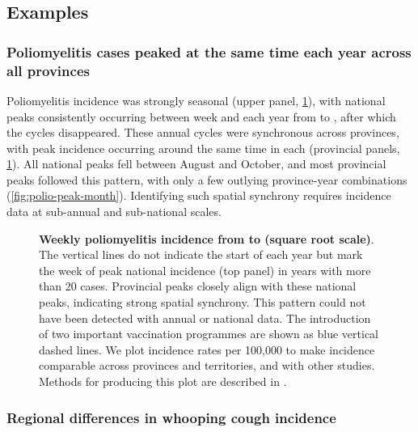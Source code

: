 \documentclass[12pt]{article}
\begin{document}
\subsection{Examples}\label{sec:illustrative-results}

\subsubsection{Poliomyelitis cases peaked at the same time each year across all provinces}\label{sec:polio-results}

Poliomyelitis incidence was strongly seasonal (upper panel, \cref{fig:polio-plot}), with national peaks consistently occurring between week  and  each year from  to , after which the cycles disappeared. These annual cycles were synchronous across provinces, with peak incidence occurring around the same time in each (provincial panels, \cref{fig:polio-plot}). All national peaks fell between August and October, and most provincial peaks followed this pattern, with only a few outlying province-year combinations (\cref{fig:polio-peak-month}). Identifying such spatial synchrony requires incidence data at sub-annual and sub-national scales.

\begin{figure}[!htb]
  \caption{\textbf{Weekly poliomyelitis incidence from \protect to \protect (square root scale)}. The vertical lines do not indicate the start of each year but mark the week of peak national incidence (top panel) in years with more than 20 cases. Provincial peaks closely align with these national peaks, indicating strong spatial synchrony. This pattern could not have been detected with annual or national data. The introduction of two important vaccination programmes are shown as blue vertical dashed lines. We plot incidence rates per 100,000 to make incidence comparable across provinces and territories, and with other studies. Methods for producing this plot are described in .}\label{fig:polio-plot}
\end{figure}

\subsubsection{Regional differences in whooping cough incidence}\label{sec:whooping-cough-results}
\end{document}
